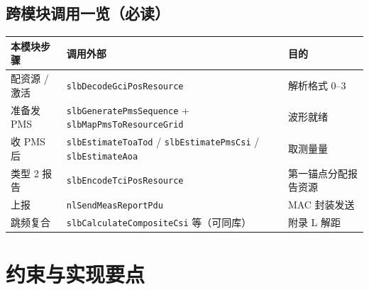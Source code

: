 \documentclass[11pt,a4paper]{ctexart}
\begin{document}
\subsection{跨模块调用一览（必读）}

\begin{table}[h]
\centering
\small
\begin{tabular}{L{2.4cm}L{4.4cm}L{6.4cm}}
\toprule
\textbf{本模块步骤} & \textbf{调用外部} & \textbf{目的} \\
\midrule
配资源 / 激活 & \texttt{slbDecodeGciPosResource} & 解析格式 0--3 \\
准备发 PMS & \texttt{slbGeneratePmsSequence} + \texttt{slbMapPmsToResourceGrid} & 波形就绪 \\
收 PMS 后 & \texttt{slbEstimateToaTod} / \texttt{slbEstimatePmsCsi} / \texttt{slbEstimateAoa} & 取测量量 \\
类型 2 报告 & \texttt{slbEncodeTciPosResource} & 第一锚点分配报告资源 \\
上报 & \texttt{nlSendMeasReportPdu} & MAC 封装发送 \\
跳频复合 & \texttt{slbCalculateCompositeCsi} 等（可同库） & 附录 L 解距 \\
\bottomrule
\end{tabular}
\end{table}

\section{约束与实现要点}
\end{document}

